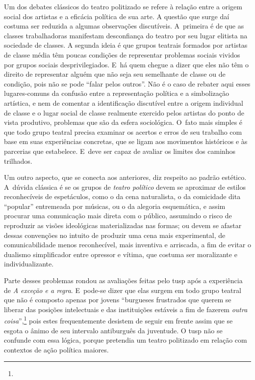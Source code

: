 \noindent{}Um dos debates clássicos do teatro politizado se refere à relação entre
a origem social dos artistas e a eficácia política de sua arte. A
questão que surge daí costuma ser reduzida a algumas observações
discutíveis. A~primeira é de que as classes trabalhadoras manifestam
desconfiança do teatro por seu lugar elitista na sociedade de classes. A
segunda ideia é que grupos teatrais formados por artistas de classe
média têm poucas condições de representar problemas sociais vividos por
grupos sociais desprivilegiados. E~há quem chegue a dizer que eles não
têm o direito de representar alguém que não seja seu semelhante de
classe ou de condição, pois não se pode “falar pelos outros”. Não é o
caso de rebater aqui esses lugares-comuns da confusão entre a
representação política e a simbolização artística, e nem de comentar a
identificação discutível entre a origem individual de classe e o lugar
social de classe realmente exercido pelos artistas do ponto de vista
produtivo, problemas que são da esfera sociológica. O~fato mais simples
é que todo grupo teatral precisa examinar os acertos e erros de seu
trabalho com base em suas experiências concretas, que se ligam aos
movimentos históricos e às parcerias que estabelece. E~deve ser capaz de
avaliar os limites dos caminhos trilhados.

Um outro aspecto, que se conecta aos anteriores, diz respeito ao padrão
estético. A~dúvida clássica é se os grupos de {\it teatro político}
devem se aproximar de estilos reconhecíveis de espetáculos, como o da
cena naturalista, o da comicidade dita “popular” entremeada por músicas,
ou o da alegoria esquemática, e assim procurar uma comunicação mais
direta com o público, assumindo o risco de reproduzir as visões
ideológicas materializadas nas formas; ou devem se afastar dessas
convenções no intuito de produzir uma cena mais experimental, de
comunicabilidade menos reconhecível, mais inventiva e arriscada, a fim
de evitar o dualismo simplificador entre opressor e vítima, que costuma
ser moralizante e individualizante.

Parte desses problemas rondou as avaliações feitas pelo {\sc tusp} após a
experiência de {\it A exceção e a regra}. E~pode-se dizer que elas
surgem em todo grupo teatral que não é composto apenas por jovens
“burgueses frustrados que querem se liberar das posições intelectuais e
das instituições estáveis a fim de fazerem {\it outra
coisa}”,\footnote{} pois estes frequentemente
desistem de seguir em frente assim que se esgota o ânimo de seu
intervalo antiburguês da juventude. O {\sc tusp} não se confunde com essa
lógica, porque pretendia um teatro politizado em relação com contextos
de ação política maiores.

